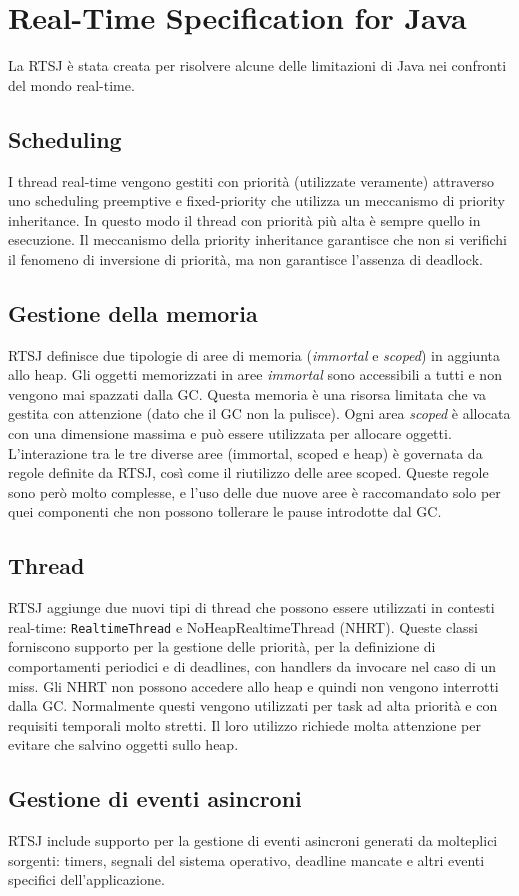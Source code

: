 \section{Real-Time Specification for Java}
La RTSJ è stata creata per risolvere alcune delle limitazioni di Java nei confronti del mondo real-time. 

\subsection{Scheduling}
I thread real-time vengono gestiti con priorità (utilizzate veramente) attraverso uno scheduling preemptive e fixed-priority che utilizza un meccanismo di priority inheritance. In questo modo il thread con priorità più alta è sempre quello in esecuzione. Il meccanismo della priority inheritance garantisce che non si verifichi il fenomeno di inversione di priorità, ma non garantisce l'assenza di deadlock.

\subsection{Gestione della memoria}
RTSJ definisce due tipologie di aree di memoria (\textit{immortal} e \textit{scoped}) in aggiunta allo heap. Gli oggetti memorizzati in aree \textit{immortal} sono accessibili a tutti e non vengono mai spazzati dalla GC. Questa memoria è una risorsa limitata che va gestita con attenzione (dato che il GC non la pulisce). Ogni area \textit{scoped} è allocata con una dimensione massima e può essere utilizzata per allocare oggetti. L'interazione tra le tre diverse aree (immortal, scoped e heap) è governata da regole definite da RTSJ, così come il riutilizzo delle aree scoped. Queste regole sono però molto complesse, e l'uso delle due nuove aree è raccomandato solo per quei componenti che non possono tollerare le pause introdotte dal GC.

\subsection{Thread}
RTSJ aggiunge due nuovi tipi di thread che possono essere utilizzati in contesti real-time: \texttt{RealtimeThread} e {NoHeapRealtimeThread} (NHRT). Queste classi forniscono supporto per la gestione delle priorità, per la definizione di comportamenti periodici e di deadlines, con handlers da invocare nel caso di un miss. Gli NHRT non possono accedere allo heap e quindi non vengono interrotti dalla GC. Normalmente questi vengono utilizzati per task ad alta priorità e con requisiti temporali molto stretti. Il loro utilizzo richiede molta attenzione per evitare che salvino oggetti sullo heap. 

\subsection{Gestione di eventi asincroni}
RTSJ include supporto per la gestione di eventi asincroni generati da molteplici sorgenti: timers, segnali del sistema operativo, deadline mancate e altri eventi specifici dell'applicazione.
